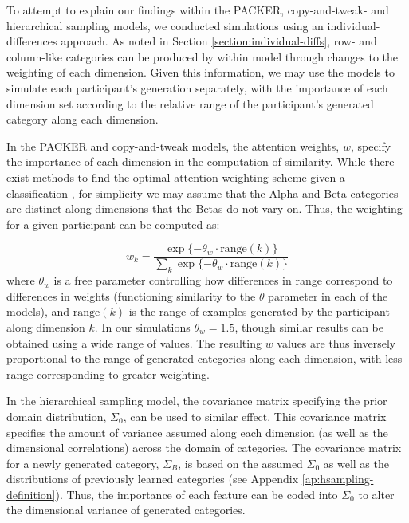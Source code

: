 \documentclass[12pt]{article}
\begin{document}
\begin{flushleft}
To attempt to explain our findings within the PACKER, copy-and-tweak- and hierarchical sampling models, we conducted simulations using an individual-differences approach. As noted in Section \ref{section:individual-diffs}, row- and column-like categories can be produced by within model through changes to the weighting of each dimension. Given this information, we may use the models to simulate each participant's generation separately, with the importance of each dimension set according to the relative range of the participant's generated category along each dimension. 

In the PACKER and copy-and-tweak models, the attention weights, $w$, specify the importance of each dimension in the computation of similarity. While there exist methods to find the optimal attention weighting scheme given a classification \citep[see][]{vanpaemel2012using}, for simplicity we may assume that the Alpha and Beta categories are distinct along dimensions that the Betas do not vary on. Thus, the weighting for a given participant can be computed as:

\begin{equation}
w_k = \dfrac
{\exp{ \{ -\theta_w \cdot\text{range}(k)}  \} } 
{ \sum_k {\exp{ \{ -\theta_w \cdot\text{range}(k)}  \} } }
\label{eq:range-weight}
\end{equation}
% 
where $\theta_w$ is a free parameter controlling how differences in range correspond to differences in weights (functioning similarity to the $\theta$ parameter in each of the models), and $\text{range}(k)$ is the range of examples generated by the participant along dimension $k$. In our simulations $\theta_w = 1.5$, though similar results can be obtained using a wide range of values. The resulting $w$ values are thus inversely proportional to the range of generated categories along each dimension, with less range corresponding to greater weighting.

In the hierarchical sampling model, the covariance matrix specifying the prior domain distribution, $\Sigma_0$, can be used to similar effect. This covariance matrix specifies the amount of variance assumed along each dimension (as well as the dimensional correlations) across the domain of categories. The covariance matrix for a newly generated category, $\Sigma_B$, is based on the assumed $\Sigma_0$ as well as the distributions of previously learned categories (see Appendix \ref{ap:hsampling-definition}). Thus, the importance of each feature can be coded into $\Sigma_0$ to alter the dimensional variance of generated categories. 


\end{flushleft}
\end{document}
